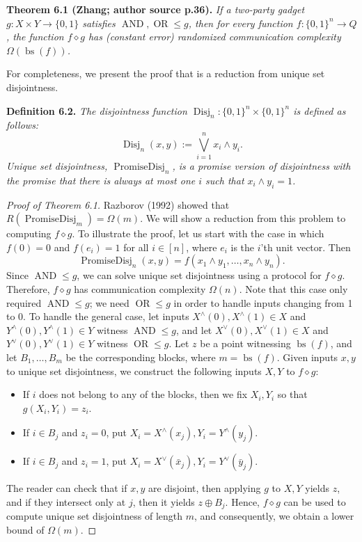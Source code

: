 \documentclass[10pt,a4paper]{article}
\newcommand{\bits}{\{0,1\}}
\newcommand{\comp}{\diamond}
\newcommand{\OR}{\operatorname{OR}}
\newcommand{\AND}{\operatorname{AND}}
\newenvironment{originalresult}[1]{\par\medskip\noindent\textbf{#1.}\itshape}{\par\medskip}
\begin{document}
\begin{originalresult}{Theorem 6.1 (Zhang; author source p.36)}
If a two-party gadget $g:X\times Y\to\bits$ satisfies $\AND,\OR\le g$, then for every function $f:\bits^n\to Q$, the function $f\comp g$ has (constant error) randomized communication complexity $\Omega(\operatorname{bs}(f))$.
\end{originalresult}
For completeness, we present the proof that is a reduction from unique set disjointness.
\begin{originalresult}{Definition 6.2}
The disjointness function $\operatorname{Disj}_n:\bits^n\times\bits^n$ is defined as follows:
\[\operatorname{Disj}_n(x,y):=\bigvee_{i=1}^n x_i\wedge y_i.\]
Unique set disjointness, $\operatorname{PromiseDisj}_n$, is a promise version of disjointness with the promise that there is always at most one $i$ such that $x_i\wedge y_i=1$.
\end{originalresult}
\begin{proof}[Proof of Theorem 6.1]
Razborov (1992) showed that $R(\operatorname{PromiseDisj}_m)=\Omega(m)$. We will show a reduction from this problem to computing $f\comp g$. To illustrate the proof, let us start with the case in which $f(0)=0$ and $f(e_i)=1$ for all $i\in[n]$, where $e_i$ is the $i$'th unit vector. Then
\[\operatorname{PromiseDisj}_n(x,y)=f(x_1\wedge y_1,\ldots,x_n\wedge y_n).\]
Since $\AND\le g$, we can solve unique set disjointness using a protocol for $f\comp g$. Therefore, $f\comp g$ has communication complexity $\Omega(n)$. Note that this case only required $\AND\le g$; we need $\OR\le g$ in order to handle inputs changing from 1 to 0.
To handle the general case, let inputs $X^\wedge(0),X^\wedge(1)\in X$ and $Y^\wedge(0),Y^\wedge(1)\in Y$ witness $\AND\le g$, and let $X^\vee(0),X^\vee(1)\in X$ and $Y^\vee(0),Y^\vee(1)\in Y$ witness $\OR\le g$.
Let $z$ be a point witnessing $\operatorname{bs}(f)$, and let $B_1,\ldots,B_m$ be the corresponding blocks, where $m=\operatorname{bs}(f)$. Given inputs $x,y$ to unique set disjointness, we construct the following inputs $X,Y$ to $f\comp g$:
\begin{itemize}
\item If $i$ does not belong to any of the blocks, then we fix $X_i,Y_i$ so that $g(X_i,Y_i)=z_i$.
\item If $i\in B_j$ and $z_i=0$, put $X_i=X^\wedge(x_j),Y_i=Y^\wedge(y_j)$.
\item If $i\in B_j$ and $z_i=1$, put $X_i=X^\vee(\bar x_j),Y_i=Y^\vee(\bar y_j)$.
\end{itemize}
The reader can check that if $x,y$ are disjoint, then applying $g$ to $X,Y$ yields $z$, and if they intersect only at $j$, then it yields $z\oplus B_j$. Hence, $f\comp g$ can be used to compute unique set disjointness of length $m$, and consequently, we obtain a lower bound of $\Omega(m)$.
\end{proof}
\end{document}
